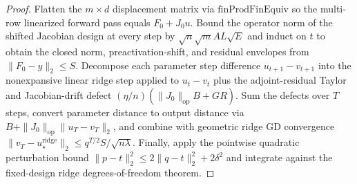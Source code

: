 \begin{proof}
\leanok
Flatten the $m\times d$ displacement matrix via $\mathrm{finProdFinEquiv}$ so the multi-row linearized forward pass equals $F_0+J_0 u$. Bound the operator norm of the shifted Jacobian design at every step by $\sqrt{n}\sqrt{m}A L\sqrt{E}$ and induct on $t$ to obtain the closed norm, preactivation-shift, and residual envelopes from $\|F_0-y\|_2\le S$. Decompose each parameter step difference $u_{t+1}-v_{t+1}$ into the nonexpansive linear ridge step applied to $u_t-v_t$ plus the adjoint-residual Taylor and Jacobian-drift defect $(\eta/n)(\|J_0\|_{\mathrm{op}}B+G R)$. Sum the defects over $T$ steps, convert parameter distance to output distance via $B+\|J_0\|_{\mathrm{op}}\|u_T-v_T\|_2$, and combine with geometric ridge GD convergence $\|v_T-u_\star^{\mathrm{ridge}}\|_2\le q^{T/2}S/\sqrt{n\lambda}$. Finally, apply the pointwise quadratic perturbation bound $\|p-t\|_2^2\le 2\|q-t\|_2^2+2\delta^2$ and integrate against the fixed-design ridge degrees-of-freedom theorem.
\end{proof}

